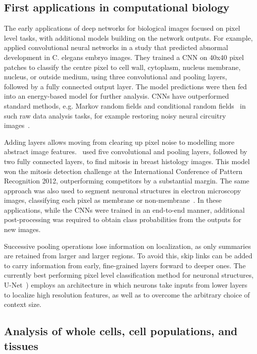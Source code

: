 \subsection{First applications in computational biology}

The early applications of deep networks for biological images focused on pixel level tasks, with additional models building on the network outputs. For example, \citet{ning_toward_2005} applied convolutional neural networks in a study that predicted abnormal development in C. elegans embryo images. They trained a CNN on 40x40 pixel patches to classify the centre pixel to cell wall, cytoplasm, nucleus membrane, nucleus, or outside medium, using three convolutional and pooling layers, followed by a fully connected output layer. The model predictions were then fed into an energy-based model for further analysis. CNNs have outperformed standard methods, e.g. Markov random fields and conditional random fields~\citep{li_markov_2009} in such raw data analysis tasks, for example restoring noisy neural circuitry images~\citep{jain_supervised_2007}.

Adding layers allows moving from clearing up pixel noise to modelling more abstract image features.~\citet{ciresan_mitosis_2013} used five convolutional and pooling layers, followed by two fully connected layers, to find mitosis in breast histology images. This model won the mitosis detection challenge at the International Conference of Pattern Recognition 2012, outperforming competitors by a substantial margin. The same approach was also used to segment neuronal structures in electron microscopy images, classifying each pixel as membrane or non-membrane~\citep{ciresan_deep_2012}. In these applications, while the CNNs were trained in an end-to-end manner, additional post-processing was required to obtain class probabilities from the outputs for new images.

Successive pooling operations lose information on localization, as only summaries are retained from larger and larger regions. To avoid this, skip links can be added to carry information from early, fine-grained layers forward to deeper ones. The currently best performing pixel level classification method for neuronal structures, U-Net~\citep{ronneberger_u-net:_2015}) employs an architecture in which neurons take inputs from lower layers to localize high resolution features, as well as to overcome the arbitrary choice of context size.


\subsection{Analysis of whole cells, cell populations, and tissues}

